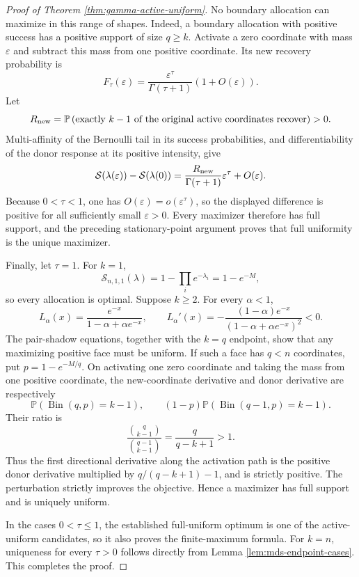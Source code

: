 \documentclass[11pt]{article}
\theoremstyle{definition}
\theoremstyle{remark}
\DeclareMathOperator{\Bin}{Bin}
\newcommand{\Pbb}{\mathbb P}
\newcommand{\1}{\mathbf 1}
\begin{document}
\begin{proof}[Proof of Theorem \ref{thm:gamma-active-uniform}]
No boundary allocation can maximize in this range of shapes.  Indeed, a boundary allocation with positive success has a positive support of size \(q\ge k\).  Activate a zero coordinate with mass \(\varepsilon\) and subtract this mass from one positive coordinate.  Its new recovery probability is
\[
  F_\tau(\varepsilon)
  =\frac{\varepsilon^\tau}{\Gamma(\tau+1)}(1+O(\varepsilon)).
\]
Let
\[
 R_{\rm new}=\Pbb\left(\text{exactly \(k-1\) of the original active
 coordinates recover}\right)>0.
\]
Multi-affinity of the Bernoulli tail in its success probabilities, and
differentiability of the donor response at its positive intensity, give
\[
 \mathcal S(\lambda(\varepsilon))-\mathcal S(\lambda(0))
 =\frac{R_{\rm new}}{\Gamma(\tau+1)}\varepsilon^\tau+O(\varepsilon).
\]
Because \(0<\tau<1\), one has \(O(\varepsilon)=o(\varepsilon^\tau)\),
so the displayed difference is positive for all sufficiently small
\(\varepsilon>0\).  Every maximizer therefore has full support, and the
preceding stationary-point argument proves that full uniformity is the
unique maximizer.

Finally, let \(\tau=1\).  For \(k=1\),
\[
  \mathcal S_{n,1,1}(\lambda)
  =1-\prod_i e^{-\lambda_i}=1-e^{-M},
\]
so every allocation is optimal.  Suppose \(k\ge2\).  For every \(\alpha<1\),
\[
  L_\alpha(x)=\frac{e^{-x}}{1-\alpha+\alpha e^{-x}},
  \qquad
  L_\alpha'(x)
  =-\frac{(1-\alpha)e^{-x}}
          {(1-\alpha+\alpha e^{-x})^2}<0.
\]
The pair-shadow equations, together with the \(k=q\) endpoint, show that any maximizing positive face must be uniform.  If such a face has \(q<n\) coordinates, put \(p=1-e^{-M/q}\).  On activating one zero coordinate and taking the mass from one positive coordinate, the new-coordinate derivative and donor derivative are respectively
\[
  \Pbb(\Bin(q,p)=k-1),
  \qquad
  (1-p)\Pbb(\Bin(q-1,p)=k-1).
\]
Their ratio is
\[
  \frac{\binom q{k-1}}{\binom{q-1}{k-1}}
  =\frac q{q-k+1}>1.
\]
Thus the first directional derivative along the activation path is the
positive donor derivative multiplied by
\(q/(q-k+1)-1\), and is strictly positive.  The perturbation strictly
improves the objective.  Hence a maximizer has full support and is
uniquely uniform.

In the cases \(0<\tau\le1\), the established full-uniform optimum is one of the active-uniform candidates, so it also proves the finite-maximum formula.  For \(k=n\), uniqueness for every \(\tau>0\) follows directly from Lemma \ref{lem:mds-endpoint-cases}.  This completes the proof.
\end{proof}
\end{document}
